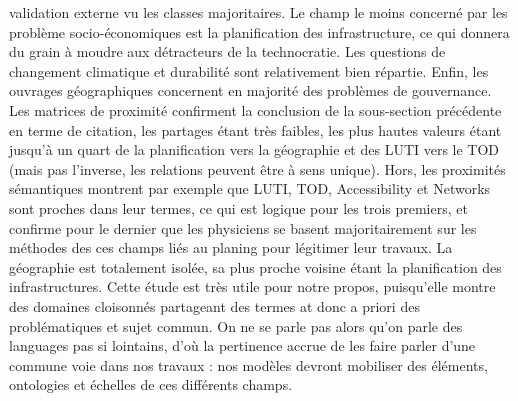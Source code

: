 {validation externe vu les classes majoritaires. Le champ le moins concerné par les problème socio-économiques est la planification des infrastructure, ce qui donnera du grain à moudre aux détracteurs de la technocratie. Les questions de changement climatique et durabilité sont relativement bien répartie. Enfin, les ouvrages géographiques concernent en majorité des problèmes de gouvernance. Les matrices de proximité confirment la conclusion de la sous-section précédente en terme de citation, les partages étant très faibles, les plus hautes valeurs étant jusqu'à un quart de la planification vers la géographie et des LUTI vers le TOD (mais pas l'inverse, les relations peuvent être à sens unique). Hors, les proximités sémantiques montrent par exemple que LUTI, TOD, Accessibility et Networks sont proches dans leur termes, ce qui est logique pour les trois premiers, et confirme pour le dernier que les physiciens se basent majoritairement sur les méthodes des ces champs liés au planing pour légitimer leur travaux. La géographie est totalement isolée, sa plus proche voisine étant la planification des infrastructures. Cette étude est très utile pour notre propos, puisqu'elle montre des domaines cloisonnés partageant des termes at donc a priori des problématiques et sujet commun. On ne se parle pas alors qu'on parle des languages pas si lointains, d'où la pertinence accrue de les faire parler d'une commune voie dans nos travaux : nos modèles devront mobiliser des éléments, ontologies et échelles de ces différents champs.
}




